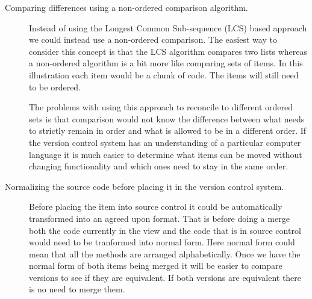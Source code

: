 \begin{description}
  \item [Comparing differences using a non-ordered comparison algorithm.]   
    Instead of using the Longest Common Sub-sequence (LCS) based approach we could instead use a non-ordered comparison.  The easiest way to consider this concept is that the LCS algorithm compares two lists whereas a non-ordered algorithm is a bit more like comparing sets of items. In this illustration each item would be a chunk of code. The items will still need to be ordered.


    The problems with using this approach to reconcile to different ordered sets is that comparison would not know the difference between what needs to strictly remain in order and what is allowed to be in a different order. If the version control system has an understanding of a particular computer language it is much easier to determine what items can be moved without changing functionality and which ones need to stay in the same order. 
  \item [Normalizing the source code before placing it in the version control system.]
    Before placing the item into source control it could be automatically transformed into an agreed upon format. That is before doing a merge both the code currently in the view and the code that is in source control would need to be tranformed into normal form.  Here normal form could mean that all the methods are arranged alphabetically.  Once we have the normal form of both items being merged it will be easier to compare versions to see if they are equivalent.  If both versions are equivalent there is no need to merge them. 


\end{description}
